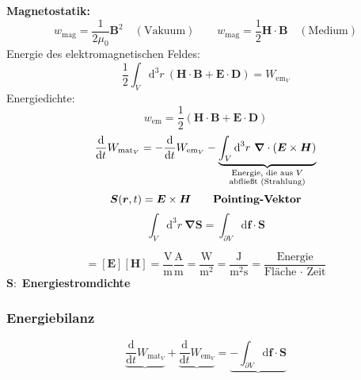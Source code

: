\documentclass[titlepage,11pt,a4paper,ngerman]{report}
\newcommand{\tx}[1]{\textrm{#1}}
\newcommand{\ub}[1]{\underbrace{#1}}
\newcommand{\dd}{\tx{d}}
\newcommand{\prd}[2]{\frac{\tx{d} #1}{\tx{d} #2}}
\renewcommand{\vec}[1]{\boldsymbol{#1}}
\newcommand{\vabla}{\boldsymbol{\nabla}}
\begin{document}
\textbf{Magnetostatik:}
\begin{equation*}
w_{\tx{mag}} = \frac{1}{2 \mu_0} \vec{B}^2 \quad (\tx{Vakuum}) \qquad w_{\tx{mag}} = \frac{1}{2} \vec{H} \cdot \vec{B} \quad (\tx{Medium})
\end{equation*}
Energie des elektromagnetischen Feldes:
\begin{equation*}
\frac{1}{2} \int_V \dd^3 r \ (\vec{H} \cdot \vec{B} + \vec{E} \cdot \vec{D}) = W_{\tx{em}_V}
\end{equation*}
Energiedichte:
\begin{equation*}
w_{\tx{em}} = \frac{1}{2} (\vec{H} \cdot \vec{B} + \vec{E} \cdot \vec{D})
\end{equation*}
\begin{equation*}
\prd{}{t} W_{\tx{mat}_V} = - \prd{}{t} W_{\tx{em}_V} - \ub{\int_V \dd^3 r \ \vabla \cdot (\vec{E} \times \vec{H})}_{\mathclap{\substack{\tx{Energie, die aus } V \\ \tx{abfließt (Strahlung)}}}}
\end{equation*}
\begin{equation*}
\vec{S}(\vec{r},t) = \vec{E} \times \vec{H} \qquad \tx{\textbf{Pointing-Vektor}}
\end{equation*}
\begin{equation*}
\int_V \dd^3 r \ \vabla \vec{S} = \int_{\partial V} \dd\vec{f}  \cdot \vec{S}
\end{equation*}


\begin{equation*}
[\vec{S}] = [\vec{E}] [\vec{H}] = \frac{\tx{V}}{\tx{m}} \frac{\tx{A}}{\tx{m}} = \frac{\tx{W}}{\tx{m}^2} = \frac{\tx{J}}{\tx{m}^2 \tx{s}} = \frac{\tx{Energie}}{\tx{Fläche } \cdot \tx{ Zeit}}
\end{equation*}
$ \vec{S}: $ \textbf{Energiestromdichte}


\subsubsection{Energiebilanz}

\begin{equation*}
\ub{\prd{}{t} W_{\tx{mat} _V}} + \ub{\prd{}{t} W_{\tx{em}_V}} = \ub{- \int_{\partial V} \dd \vec{f} \cdot \vec{S}}
\end{equation*}

\end{document}
